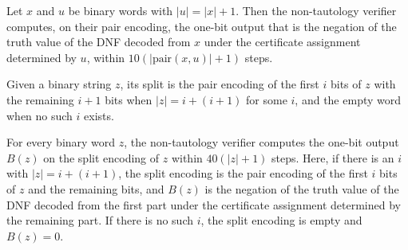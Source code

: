 \begin{lemma}
\label{Complexity.taut_machine_pair}
\leanok
{}
Let $x$ and $u$ be binary words with $|u|=|x|+1$. Then the non-tautology verifier
computes, on their pair encoding, the one-bit output that is the negation of the truth
value of the DNF decoded from $x$ under the certificate assignment determined by $u$,
within $10(|\mathrm{pair}(x,u)|+1)$ steps.
\end{lemma}

\begin{definition}
\label{Complexity.tautSplit}
\leanok
{}
Given a binary string $z$, its split is the pair encoding of the first $i$ bits of $z$
with the remaining $i + 1$ bits when $|z| = i + (i + 1)$ for some $i$, and the empty
word when no such $i$ exists.
\end{definition}

\begin{lemma}
\label{Complexity.taut_machine_split}
\leanok
{}
For every binary word $z$, the non-tautology verifier computes the one-bit output $B(z)$
on the split encoding of $z$ within $40(|z|+1)$ steps. Here, if there is an $i$ with
$|z|=i+(i+1)$, the split encoding is the pair encoding of the first $i$ bits of $z$ and
the remaining bits, and $B(z)$ is the negation of the truth value of the DNF decoded
from the first part under the certificate assignment determined by the remaining part.
If there is no such $i$, the split encoding is empty and $B(z)=0$.
\end{lemma}

